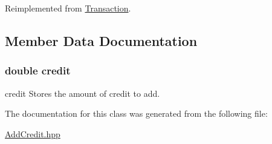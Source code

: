 Reimplemented from \hyperlink{class_transaction_a8e5996ad33eb07eef44f55deba6c298e}{Transaction}.



\subsection{Member Data Documentation}
\hypertarget{class_add_credit_aa559c3686bb9d38c3335c16bbea07be8}{
\subsubsection[{credit}]{\setlength{\rightskip}{0pt plus 5cm}double credit\hspace{0.3cm}{\ttfamily [private]}}}\label{class_add_credit_aa559c3686bb9d38c3335c16bbea07be8}


credit Stores the amount of credit to add. 



The documentation for this class was generated from the following file\-:\begin{DoxyCompactItemize}
\item 
\hyperlink{_add_credit_8hpp}{Add\-Credit.\-hpp}\end{DoxyCompactItemize}
